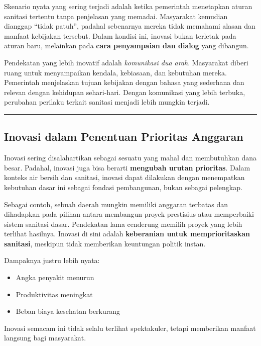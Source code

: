 \documentclass[
  letterpaper,
  DIV=11,
  numbers=noendperiod]{scrreprt}
\providecommand{\tightlist}{%
  \setlength{\itemsep}{0pt}\setlength{\parskip}{0pt}}
\begin{document}
Skenario nyata yang sering terjadi adalah ketika pemerintah menetapkan
aturan sanitasi tertentu tanpa penjelasan yang memadai. Masyarakat
kemudian dianggap ``tidak patuh'', padahal sebenarnya mereka tidak
memahami alasan dan manfaat kebijakan tersebut. Dalam kondisi ini,
inovasi bukan terletak pada aturan baru, melainkan pada \textbf{cara
penyampaian dan dialog} yang dibangun.

Pendekatan yang lebih inovatif adalah \emph{komunikasi dua arah}.
Masyarakat diberi ruang untuk menyampaikan kendala, kebiasaan, dan
kebutuhan mereka. Pemerintah menjelaskan tujuan kebijakan dengan bahasa
yang sederhana dan relevan dengan kehidupan sehari-hari. Dengan
komunikasi yang lebih terbuka, perubahan perilaku terkait sanitasi
menjadi lebih mungkin terjadi.

\begin{center}\rule{0.5\linewidth}{0.5pt}\end{center}

\subsection{Inovasi dalam Penentuan Prioritas
Anggaran}\label{inovasi-dalam-penentuan-prioritas-anggaran}

Inovasi sering disalahartikan sebagai sesuatu yang mahal dan membutuhkan
dana besar. Padahal, inovasi juga bisa berarti \textbf{mengubah urutan
prioritas}. Dalam konteks air bersih dan sanitasi, inovasi dapat
dilakukan dengan menempatkan kebutuhan dasar ini sebagai fondasi
pembangunan, bukan sebagai pelengkap.

Sebagai contoh, sebuah daerah mungkin memiliki anggaran terbatas dan
dihadapkan pada pilihan antara membangun proyek prestisius atau
memperbaiki sistem sanitasi dasar. Pendekatan lama cenderung memilih
proyek yang lebih terlihat hasilnya. Inovasi di sini adalah
\textbf{keberanian untuk memprioritaskan sanitasi}, meskipun tidak
memberikan keuntungan politik instan.

Dampaknya justru lebih nyata:

\begin{itemize}
\tightlist
\item
  Angka penyakit menurun
\item
  Produktivitas meningkat
\item
  Beban biaya kesehatan berkurang
\end{itemize}

Inovasi semacam ini tidak selalu terlihat spektakuler, tetapi memberikan
manfaat langsung bagi masyarakat.
\end{document}
